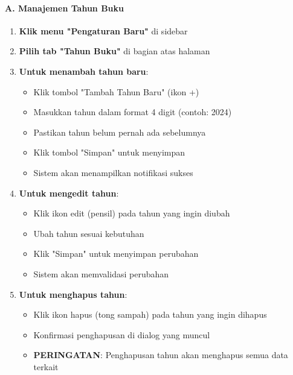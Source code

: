 \documentclass[12pt,a4paper]{article}
\begin{document}
\paragraph{A. Manajemen Tahun Buku}
\begin{enumerate}
\item \textbf{Klik menu "Pengaturan Baru"} di sidebar
\item \textbf{Pilih tab "Tahun Buku"} di bagian atas halaman
\item \textbf{Untuk menambah tahun baru}:
\begin{itemize}
\item Klik tombol "Tambah Tahun Baru" (ikon +)
\item Masukkan tahun dalam format 4 digit (contoh: 2024)
\item Pastikan tahun belum pernah ada sebelumnya
\item Klik tombol "Simpan" untuk menyimpan
\item Sistem akan menampilkan notifikasi sukses
\end{itemize}
\item \textbf{Untuk mengedit tahun}:
\begin{itemize}
\item Klik ikon edit (pensil) pada tahun yang ingin diubah
\item Ubah tahun sesuai kebutuhan
\item Klik "Simpan" untuk menyimpan perubahan
\item Sistem akan memvalidasi perubahan
\end{itemize}
\item \textbf{Untuk menghapus tahun}:
\begin{itemize}
\item Klik ikon hapus (tong sampah) pada tahun yang ingin dihapus
\item Konfirmasi penghapusan di dialog yang muncul
\item \textbf{PERINGATAN}: Penghapusan tahun akan menghapus semua data terkait
\end{itemize}
\end{enumerate}
\end{document}
